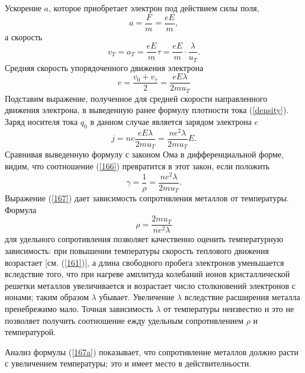 \documentclass[a4paper,10pt]{book}
\begin{document}
Ускорение $a$, которое приобретает электрон под действием силы поля,
\begin{equation*}
 a = \frac{F}{m} = \frac{eE}{m},
\end{equation*}
а скорость 
\begin{equation}\label{164}
 v_T = a_T = \frac{eE}{m}\tau = \frac{eE}{m} \cdot \frac{\lambda}{u_T}.
\end{equation}
Средняя скорость упорядоченного движения электрона
\begin{equation}\label{165}
 v = \frac{v_0 + v_\tau}{2} = \frac{eE\lambda}{2mu_T}
\end{equation}
Подставим выражение, полученное для средней скорости направленного движения электрона, в выведенную ранее формулу плотности тока (\ref{density}).
Заряд носителя тока $q_0$ в данном случае является зарядом электрона $e$
\begin{equation}\label{166}
 j = ne\frac{eE\lambda}{2mu_T} = \frac{ne^2\lambda}{2mu_T}E.
\end{equation}
Сравнивая выведенную формулу с законом Ома в дифференциальной форме, видим, что соотношение (\ref{166}) превратится в этот закон, если положить
\begin{equation}\label{167}
 \gamma = \frac{1}{\rho} = \frac{ne^2\lambda}{2mu_T}.
\end{equation}
Выражение (\ref{167}) дает зависимость сопротивления металлов от температуры. Формула
\begin{equation}\label{167a}
 \rho = \frac{2mu_T}{ne^2\lambda}
\end{equation}
для удельного сопротивления позволяет качественно оценить температурную зависимость: при повышении температуры скорость теплового движения
возрастает [см. (\ref{161})], а длина свободного пробега электронов уменьшается вследствие того, что при нагреве амплитуда колебаний ионов
кристаллической решетки металлов увеличивается и возрастает число столкновений электронов с ионами; таким образом $\lambda$ убывает. Увеличение
$\lambda$ вследствие расширения металла пренебрежимо мало. Точная зависимость $\lambda$ от температуры неизвестно и это не позволяет получить
соотношение ежду удельным сопротивлением $\rho$ и температурой. 

Анализ формулы (\ref{167a}) показывает, что сопротивление металлов должно расти с увеличением температуры; это и имеет место в действителньости.
\end{document}
